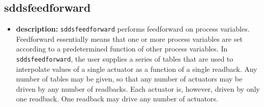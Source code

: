 %
%
\begin{latexonly}
\newpage
\end{latexonly}

%
%
\subsection{sddsfeedforward}
\label{sddsfeedforward}

\begin{itemize}
\item {\bf description:}
%
%
\verb+sddsfeedforward+ performs feedforward on process variables.
Feedforward essentially means that one or more process variables are
set according to a predetermined function of other process variables.
In \verb+sddsfeedforward+, the user supplies a series of tables that
are used to interpolate values of a single actuator as a function of a
single readback.  Any number of tables may be given, so that any
number of actuators may be driven by any number of readbacks.  Each
actuator is, however, driven by only one readback.  One readback may
drive any number of actuators.


\end{itemize}

